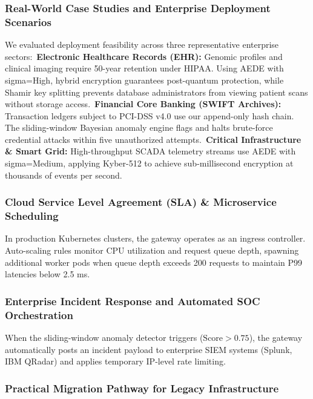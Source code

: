 \documentclass[5p,times]{elsarticle}
\begin{document}
\subsubsection{Real-World Case Studies and Enterprise Deployment Scenarios}

We evaluated deployment feasibility across three representative enterprise sectors:\newline \textbullet\  \textbf{Electronic Healthcare Records (EHR):} Genomic profiles and clinical imaging require 50-year retention under HIPAA. Using AEDE with sigma=High, hybrid encryption guarantees post-quantum protection, while Shamir key splitting prevents database administrators from viewing patient scans without storage access.\newline \textbullet\  \textbf{Financial Core Banking (SWIFT Archives):} Transaction ledgers subject to PCI-DSS v4.0 use our append-only hash chain. The sliding-window Bayesian anomaly engine flags and halts brute-force credential attacks within five unauthorized attempts.\newline \textbullet\  \textbf{Critical Infrastructure \& Smart Grid:} High-throughput SCADA telemetry streams use AEDE with sigma=Medium, applying Kyber-512 to achieve sub-millisecond encryption at thousands of events per second.


\subsubsection{Cloud Service Level Agreement (SLA) \& Microservice Scheduling}

In production Kubernetes clusters, the gateway operates as an ingress controller. Auto-scaling rules monitor CPU utilization and request queue depth, spawning additional worker pods when queue depth exceeds 200 requests to maintain P99 latencies below 2.5 ms.


\subsubsection{Enterprise Incident Response and Automated SOC Orchestration}

When the sliding-window anomaly detector triggers ($\text{Score} > 0.75$), the gateway automatically posts an incident payload to enterprise SIEM systems (Splunk, IBM QRadar) and applies temporary IP-level rate limiting.


\subsubsection{Practical Migration Pathway for Legacy Infrastructure}
\end{document}
